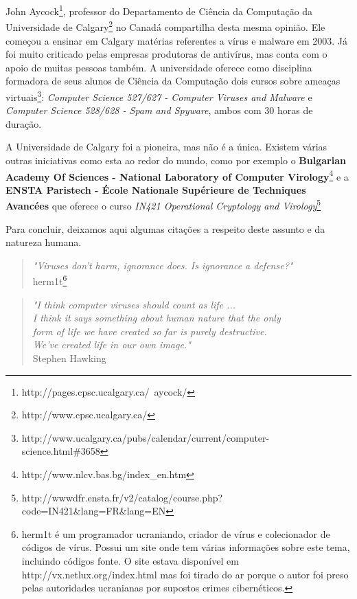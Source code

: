 John Aycock\footnote{http://pages.cpsc.ucalgary.ca/~aycock/}, professor do Departamento de Ciência da Computação da Universidade de Calgary\footnote{http://www.cpsc.ucalgary.ca/} no Canadá compartilha desta mesma opinião. Ele começou a ensinar em Calgary matérias referentes a vírus e malware em 2003. Já foi muito criticado pelas empresas produtoras de antivírus, mas conta com o apoio de muitas pessoas também. A universidade oferece como disciplina formadora de seus alunos de Ciência da Computação dois cursos sobre ameaças virtuais\footnote{http://www.ucalgary.ca/pubs/calendar/current/computer-science.html\#3658}: \textit{Computer Science 527/627 - Computer Viruses and Malware} e \textit{Computer Science 528/628 - Spam and Spyware}, ambos com 30 horas de duração.

A Universidade de Calgary foi a pioneira, mas não é a única. Existem várias outras iniciativas como esta ao redor do mundo, como por exemplo o \textbf{Bulgarian Academy Of Sciences - National Laboratory of Computer Virology}\footnote{http://www.nlcv.bas.bg/index\_en.htm} e a \textbf{ENSTA Paristech - École Nationale Supérieure de Techniques Avancées} que oferece o curso \textit{IN421 Operational Cryptology and Virology}\footnote{http://wwwdfr.ensta.fr/v2/catalog/course.php?code=IN421\&lang=FR\&lang=EN}

Para concluir, deixamos aqui algumas citações a respeito deste assunto e da natureza humana.
\begin{quotation}
\noindent
\emph{"Viruses don’t harm, ignorance does. Is ignorance a defense?"}\\
herm1t\footnote{herm1t é um programador ucraniando, criador de vírus e colecionador de códigos de vírus. Possui um site onde tem várias informações sobre este tema, incluindo códigos fonte. O site estava disponível em http://vx.netlux.org/index.html mas foi tirado do ar porque o autor foi preso pelas autoridades ucranianas por supostos crimes cibernéticos.}
\end{quotation}

\newpage

\begin{quotation}
\noindent
\emph{"I think computer viruses should count as life ... \\
I think it says something about human nature that the only \\
form of life we have created so far is purely destructive. \\
We've created life in our own image."}\\
Stephen Hawking 
\end{quotation}


